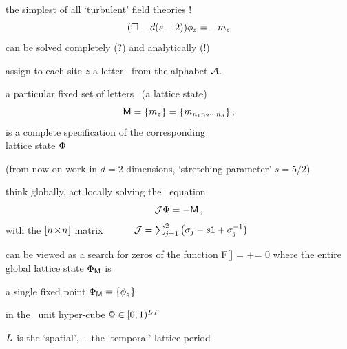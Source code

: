 \begin{frame}{the simplest of all `turbulent' field theories ! }
\catlatt
\[
 (\Box -d(s-2))\phi_{z} = - m_z
\] %
\bigskip
\hfill can be solved completely (?) and analytically (!)

\bigskip
\bigskip

assign to each site $z$ a
letter \ from the alphabet $\mathcal{A}$.

\medskip

a particular fixed set
of letters  \ (a lattice state)
\[
\Mm= \{\Ssym{z}\} %
 = \{\Ssym{n_1 n_2 \cdots n_d}\}
\,,
\]
is a complete specification of the corresponding \\
lattice state $\Phi$
\bigskip

{\color{blue}\footnotesize
(from now on work in $d=2$ dimensions, `stretching parameter' $s=5/2$)
}
\end{frame}

\begin{frame}{think globally, act locally}
solving the \catlatt\ equation
\[
{\cal J}\Phi= -\mathsf{M}
\,,
\]
with
the $[{n_{}}\!\times\!{n_{}}]$ matrix ~~~~~
\(
{\cal J} = \sum_{j=1}^{2}\left(\mathbf{\sigma}_j-{s}\mathsf{1}+\mathbf{\sigma}_{j}^{-1}\right)
\) %
\medskip

can be viewed as a search for zeros of the function
\beq
F[\Xx] = \jMorb\Xx+\Mm = 0
where the entire {\color{blue}global lattice state} ${\Phi}_{\mathsf{M}}$ is
\medskip

a single {\color{blue}fixed point}
${\Phi}_{\mathsf{M}}=\{\phi_z\}$

\hfill
in the \speriod{}\period{}\dmn\ unit hyper-cube $\Phi\in[0,1)^{{L_{}}{T_{}}}$
\medskip

${L_{}}$ is the `spatial',
$\period{}$ the `temporal' lattice period
\end{frame}

